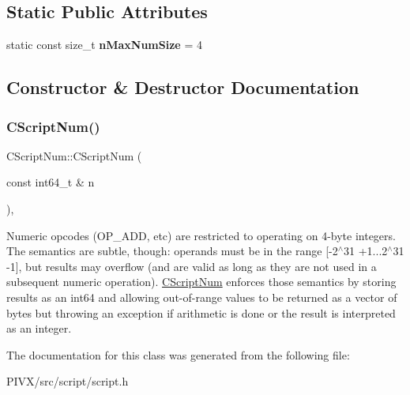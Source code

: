 \subsection*{Static Public Attributes}
\begin{DoxyCompactItemize}
\item 
\mbox{\label{class_c_script_num_a50a64fe3041a47f7d87d64d4533b5431}} 
static const size\+\_\+t {\bfseries n\+Max\+Num\+Size} = 4
\end{DoxyCompactItemize}


\subsection{Constructor \& Destructor Documentation}
\mbox{\label{class_c_script_num_abd546b6e7786ba70aeeb81e218d055bc}} 
\subsubsection{\texorpdfstring{C\+Script\+Num()}{CScriptNum()}}
{\footnotesize\ttfamily C\+Script\+Num\+::\+C\+Script\+Num (\begin{DoxyParamCaption}\item[{const int64\+\_\+t \&}]{n }\end{DoxyParamCaption})\hspace{0.3cm}{\ttfamily [inline]}, {\ttfamily [explicit]}}

Numeric opcodes (O\+P\+\_\+A\+DD, etc) are restricted to operating on 4-\/byte integers. The semantics are subtle, though\+: operands must be in the range \mbox{[}-\/2$^\wedge$31 +1...2$^\wedge$31 -\/1\mbox{]}, but results may overflow (and are valid as long as they are not used in a subsequent numeric operation). \mbox{\hyperlink{class_c_script_num}{C\+Script\+Num}} enforces those semantics by storing results as an int64 and allowing out-\/of-\/range values to be returned as a vector of bytes but throwing an exception if arithmetic is done or the result is interpreted as an integer. 

The documentation for this class was generated from the following file\+:\begin{DoxyCompactItemize}
\item 
P\+I\+V\+X/src/script/script.\+h\end{DoxyCompactItemize}
